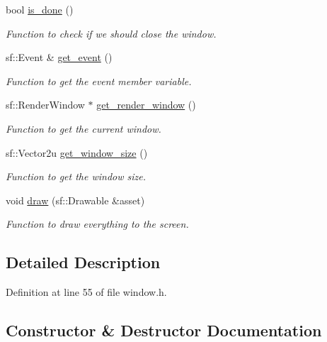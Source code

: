 \begin{DoxyCompactItemize}
bool \hyperlink{class_window_ad8206b00f1fcb41deb97d34a58f10e14}{is\+\_\+done} ()
\begin{DoxyCompactList}\small\item\em Function to check if we should close the window. \end{DoxyCompactList}\item 
sf\+::\+Event \& \hyperlink{class_window_a878ba53cecdd324dd80274caa0c98a7c}{get\+\_\+event} ()
\begin{DoxyCompactList}\small\item\em Function to get the event member variable. \end{DoxyCompactList}\item 
sf\+::\+Render\+Window $\ast$ \hyperlink{class_window_ae921197766adfddd372dcc40879f8b45}{get\+\_\+render\+\_\+window} ()
\begin{DoxyCompactList}\small\item\em Function to get the current window. \end{DoxyCompactList}\item 
sf\+::\+Vector2u \hyperlink{class_window_a44853817aa046240897d0ce78003bacd}{get\+\_\+window\+\_\+size} ()
\begin{DoxyCompactList}\small\item\em Function to get the window size. \end{DoxyCompactList}\item 
void \hyperlink{class_window_ab9e37002f72c90f1a6075459729f6c0f}{draw} (sf\+::\+Drawable \&asset)
\begin{DoxyCompactList}\small\item\em Function to draw everything to the screen. \end{DoxyCompactList}\end{DoxyCompactItemize}


\subsection{Detailed Description}


Definition at line 55 of file window.\+h.



\subsection{Constructor \& Destructor Documentation}
\mbox{\label{class_window_a74e6087da23d3c24e9fac0245e5ec92c}} 
